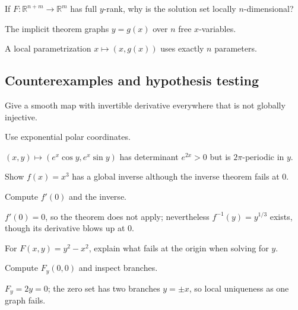 \begin{exercise}\label{exr:ii09-expand-09}
If \(F:\mathbb R^{n+m}\to\mathbb R^m\) has full \(y\)-rank, why is the solution set locally \(n\)-dimensional?
\end{exercise}
\begin{hint}
The implicit theorem graphs \(y=g(x)\) over \(n\) free \(x\)-variables.
\end{hint}
\begin{solution}
A local parametrization \(x\mapsto(x,g(x))\) uses exactly \(n\) parameters.
\end{solution}

\subsection*{Counterexamples and hypothesis testing}

\begin{exercise}\label{exr:ii09-expand-10}
Give a smooth map with invertible derivative everywhere that is not globally injective.
\end{exercise}
\begin{hint}
Use exponential polar coordinates.
\end{hint}
\begin{solution}
\((x,y)\mapsto(e^x\cos y,e^x\sin y)\) has determinant \(e^{2x}>0\) but is \(2\pi\)-periodic in \(y\).
\end{solution}

\begin{exercise}\label{exr:ii09-expand-11}
Show \(f(x)=x^3\) has a global inverse although the inverse theorem fails at \(0\).
\end{exercise}
\begin{hint}
Compute \(f'(0)\) and the inverse.
\end{hint}
\begin{solution}
\(f'(0)=0\), so the theorem does not apply; nevertheless \(f^{-1}(y)=y^{1/3}\) exists, though its derivative blows up at \(0\).
\end{solution}

\begin{exercise}\label{exr:ii09-expand-12}
For \(F(x,y)=y^2-x^2\), explain what fails at the origin when solving for \(y\).
\end{exercise}
\begin{hint}
Compute \(F_y(0,0)\) and inspect branches.
\end{hint}
\begin{solution}
\(F_y=2y=0\); the zero set has two branches \(y=\pm x\), so local uniqueness as one graph fails.
\end{solution}

